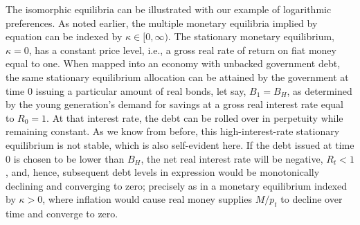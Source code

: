 The isomorphic equilibria can be illustrated with our 
example of logarithmic preferences. As noted earlier,
the multiple monetary equilibria implied by
equation  can be indexed by
$\kappa \in [0,\infty)$. The
stationary monetary equilibrium, $\kappa = 0$, has
a constant price level, i.e., a gross real rate of
return on fiat money equal to one. When mapped into
an economy with unbacked government debt, the same
stationary equilibrium allocation can be attained by 
the government at time $0$ issuing a particular 
amount of real bonds, let say, $B_1=B_H$,
as determined by the young generation's demand for
savings at a gross real interest rate equal to 
$R_0=1$. At that interest rate, the debt can be 
rolled over in perpetuity while remaining constant. As we
know from before, this high-interest-rate stationary 
equilibrium is not stable, which is also self-evident here.
If the debt issued at time $0$ is chosen to be lower 
than $B_H$, the net real interest rate will 
be negative, $R_t<1$, and, hence, subsequent debt 
levels in expression  would be monotonically 
declining and converging to zero; precisely as in a monetary 
equilibrium indexed by $\kappa > 0$, where inflation 
would cause real money supplies $M/p_t$ to decline over 
time and converge to zero.

